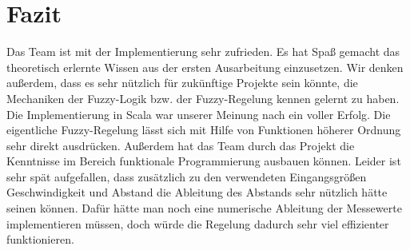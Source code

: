 \documentclass[12pt,a4paper,bibliography=totocnumbered,listof=totocnumbered, abstracton]{scrartcl}
\theoremstyle{Umgebung}
\begin{document}
\section{Fazit}

Das Team ist mit der Implementierung sehr zufrieden. Es hat Spaß gemacht das theoretisch erlernte Wissen aus der ersten Ausarbeitung einzusetzen. Wir denken außerdem, dass es sehr nützlich für zukünftige Projekte sein könnte, die Mechaniken der Fuzzy-Logik bzw. der Fuzzy-Regelung kennen gelernt zu haben. Die Implementierung in Scala war unserer Meinung nach ein voller Erfolg. Die eigentliche Fuzzy-Regelung lässt sich mit Hilfe von Funktionen höherer Ordnung sehr direkt ausdrücken. Außerdem hat das Team durch das Projekt die Kenntnisse im Bereich funktionale Programmierung ausbauen können. Leider ist sehr spät aufgefallen, dass zusätzlich zu den verwendeten Eingangsgrößen Geschwindigkeit und Abstand die Ableitung des Abstands sehr nützlich hätte seinen können. Dafür hätte man noch eine numerische Ableitung der Messewerte implementieren müssen, doch würde die Regelung dadurch sehr viel effizienter funktionieren. 

\end{document}
